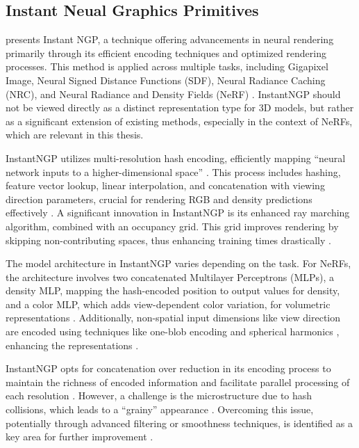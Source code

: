 \subsection{Instant Neual Graphics Primitives}\label{InstantNGP}

\citeauthor{M_ller_2022} presents Instant NGP, a technique offering advancements in neural rendering primarily through its efficient encoding techniques and optimized rendering processes. This method is applied across multiple tasks, including Gigapixel Image, Neural Signed Distance Functions (SDF), Neural Radiance Caching (NRC), and Neural Radiance and Density Fields (NeRF) \citep{M_ller_2022}. InstantNGP should not be viewed directly as a distinct representation type for 3D models, but rather as a significant extension of existing methods, especially in the context of NeRFs, which are relevant in this thesis.

InstantNGP utilizes multi-resolution hash encoding, efficiently mapping ``neural network inputs to a higher-dimensional space'' \citep{M_ller_2022}. This process includes hashing, feature vector lookup, linear interpolation, and concatenation with viewing direction parameters, crucial for rendering RGB and density predictions effectively \citep{M_ller_2022}. A significant innovation in InstantNGP is its enhanced ray marching algorithm, combined with an occupancy grid. This grid improves rendering by skipping non-contributing spaces, thus enhancing training times drastically \citep{M_ller_2022}.

The model architecture in InstantNGP varies depending on the task. For NeRFs, the architecture involves two concatenated Multilayer Perceptrons (MLPs), a density MLP, mapping the hash-encoded position to output values for density, and a color MLP, which adds view-dependent color variation, for volumetric representations \citep{M_ller_2022}. Additionally, non-spatial input dimensions like view direction are encoded using techniques like one-blob encoding \citep{oneBlob_mueller} and spherical harmonics \citep{verbin2021refnerf}, enhancing the representations \citep{M_ller_2022}.

InstantNGP opts for concatenation over reduction in its encoding process to maintain the richness of encoded information and facilitate parallel processing of each resolution \citep{M_ller_2022}. However, a challenge is the microstructure due to hash collisions, which leads to a ``grainy'' appearance \citep{M_ller_2022}. Overcoming this issue, potentially through advanced filtering or smoothness techniques, is identified as a key area for further improvement \citep{M_ller_2022}.